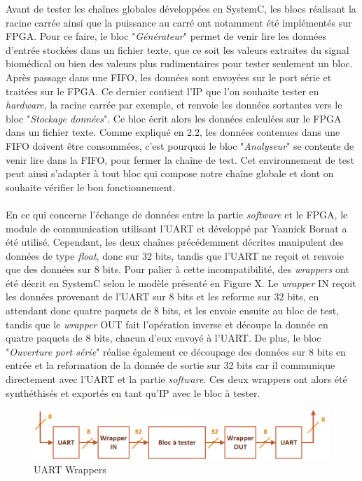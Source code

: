 \documentclass[a4paper,12pt]{article}
\begin{document}
Avant de tester les chaînes globales développées en SystemC, les blocs réalisant la racine carrée ainsi que la puissance au carré ont notamment été implémentés sur FPGA. Pour ce faire, le bloc "\textit{Générateur}" permet de venir lire les données d'entrée stockées dans un fichier texte, que ce soit les valeurs extraites du signal biomédical ou bien des valeurs plus rudimentaires pour tester seulement un bloc. Après passage dans une FIFO, les données sont envoyées sur le port série et traitées sur le FPGA. Ce dernier contient l'IP que l'on souhaite tester en \textit{hardware}, la racine carrée par exemple, et renvoie les données sortantes vers le bloc "\textit{Stockage données}". Ce bloc écrit alors les données calculées sur le FPGA dans un fichier texte. Comme expliqué en 2.2, les données contenues dans une FIFO doivent être consommées, c'est pourquoi le bloc "\textit{Analyseur}" se contente de venir lire dans la FIFO, pour fermer la chaîne de test. Cet environnement de test peut ainsi s'adapter à tout bloc qui compose notre chaîne globale et dont on souhaite vérifier le bon fonctionnement. \\ \\
\indent En ce qui concerne l'échange de données entre la partie \textit{software} et le FPGA, le module de communication utilisant l'UART et développé par Yannick Bornat a été utilisé. Cependant, les deux chaînes précédemment décrites manipulent des données de type \textit{float}, donc sur 32 bits, tandis que l'UART ne reçoit et renvoie que des données sur 8 bits. Pour palier à cette incompatibilité, des \textit{wrappers} ont été décrit en SystemC selon le modèle présenté en Figure X. Le \textit{wrapper} IN reçoit les données provenant de l'UART sur 8 bits et les reforme sur 32 bits, en attendant donc quatre paquets de 8 bits, et les envoie ensuite au bloc de test, tandis que le \textit{wrapper} OUT fait l'opération inverse et découpe la donnée en quatre paquets de 8 bits, chacun d'eux envoyé à l'UART. De plus, le bloc "\textit{Ouverture port série}" réalise également ce découpage des données sur 8 bits en entrée et la reformation de la donnée de sortie sur 32 bits car il communique directement avec l'UART et la partie \textit{software}. Ces deux wrappers ont alors été synthéthisés et exportés en tant qu'IP avec le bloc à tester.  
\begin{figure}[H]
\centering
\includegraphics[width=\textwidth]{Dessin7.png}
\caption{UART Wrappers}
\end{figure}   
\end{document}
